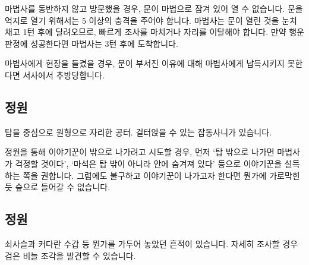 \documentclass{report}
\begin{document}
		마법사를 동반하지 않고 방문했을 경우, 문이 마법으로 잠겨 있어 열 수 없습니다. 문을 억지로 열기 위해서는 5 이상의 충격을 주어야 합니다. 마법사는 문이 열린 것을 눈치 채고 1턴 후에 달려오므로, 빠르게 조사를 마치거나 자리를 이탈해야 합니다. 만약 행운 판정에 성공한다면 마법사는 3턴 후에 도착합니다.
		
		마법사에게 현장을 들켰을 경우, 문이 부서진 이유에 대해 마법사에게 납득시키지 못한다면 서사에서 추방당합니다.
	
	\subsection*{정원}
		탑을 중심으로 원형으로 자리한 공터. 걸터앉을 수 있는 잡동사니가 있습니다.
		
		정원을 통해 이야기꾼이 밖으로 나가려고 시도할 경우, 먼저 `탑 밖으로 나가면 마법사가 걱정할 것이다', `마석은 탑 밖이 아니라 안에 숨겨져 있다' 등으로 이야기꾼을 설득하는 쪽을 권합니다. 그럼에도 불구하고 이야기꾼이 나가고자 한다면 뭔가에 가로막힌 듯 숲으로 들어갈 수 없습니다.
	
	\subsection*{정원}
		쇠사슬과 커다란 수갑 등 뭔가를 가두어 놓았던 흔적이 있습니다. 자세히 조사할 경우 \hypertarget{black-scale}{검은 비늘 조각}을 발견할 수 있습니다.
	
\end{document}
